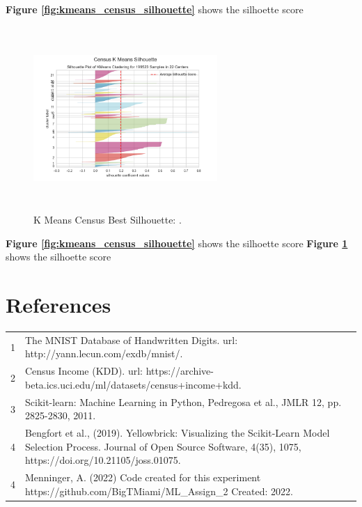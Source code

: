 \documentclass[letterpaper]{article} %
\begin{document}
 \textbf{Figure \ref{fig:kmeans_census_silhouette}} shows the silhoette score
 
 \begin{figure}[!htb]
\centering
\includegraphics[width=2.75in, height=2.75in]{figures/Census_silhouette_K_22.png}
\caption{K Means Census Best Silhouette:  . }
\label{fig:kmeans_census_silhouette_best}
\end{figure}

 \textbf{Figure \ref{fig:kmeans_census_silhouette}} shows the silhoette score
  \textbf{Figure \ref{fig:kmeans_census_silhouette_best}} shows the silhoette score


\section{References}
\begin{tabular}{l p{2.75in}}
\\
1 & The MNIST Database of Handwritten Digits. url: http://yann.lecun.com/exdb/mnist/.
\\
2 & Census Income (KDD). url: https://archive-beta.ics.uci.edu/ml/datasets/census+income+kdd.
\\
3 & Scikit-learn: Machine Learning in Python, Pedregosa et al., JMLR 12, pp. 2825-2830, 2011.
\\
4 & Bengfort et al., (2019). Yellowbrick: Visualizing the Scikit-Learn Model Selection Process. Journal of Open Source Software, 4(35), 1075, https://doi.org/10.21105/joss.01075.
\\
4 & Menninger, A. (2022)  Code created for this experiment https://github.com/BigTMiami/ML\_Assign\_2  Created: 2022.
\end{tabular}
\end{document}
